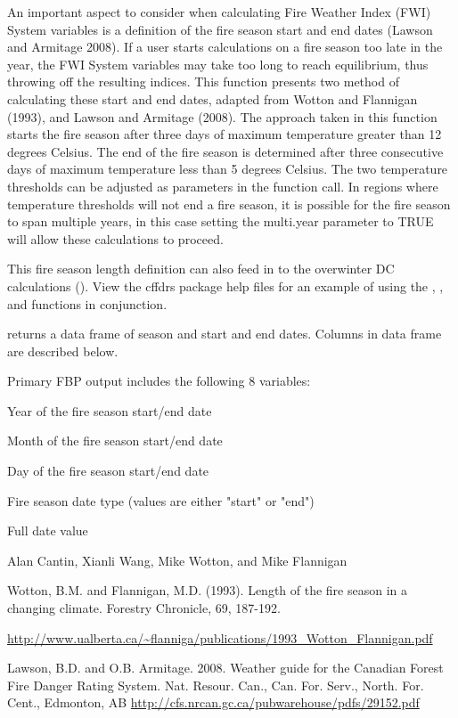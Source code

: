 \documentclass[a4paper]{book}
\begin{document}
\begin{Details}\relax
An important aspect to consider when calculating Fire Weather Index (FWI)
System variables is a definition of the fire season start and end dates
(Lawson and Armitage 2008). If a user starts calculations on a fire season
too late in the year, the FWI System variables may take too long to reach
equilibrium, thus throwing off the resulting indices. This function presents
two method of calculating these start and end dates, adapted from Wotton and
Flannigan (1993), and Lawson and Armitage (2008). The approach taken in this
function starts the fire season after three days of maximum temperature
greater than 12 degrees Celsius. The end of the fire season is determined
after three consecutive days of maximum temperature less than 5 degrees
Celsius.  The two temperature thresholds can be adjusted as parameters in
the function call. In regions where temperature thresholds will not end a
fire season, it is possible for the fire season to span multiple years, in
this case setting the multi.year parameter to TRUE will allow these
calculations to proceed.

This fire season length definition can also feed in to the overwinter DC
calculations (). View the cffdrs package help files for an example
of using the , , and  functions in
conjunction.
\end{Details}
%
\begin{Value}
 returns a data frame of season and start and end
dates. Columns in data frame are described below.

Primary FBP output includes the following 8 variables: 
\begin{ldescription}
\item[\code{yr }] Year of the fire season start/end date
\item[\code{mon }] Month of the fire season start/end date
\item[\code{day }] Day of the fire season start/end date
\item[\code{fsdatetype }] Fire season date type (values are either "start" or "end")
\item[\code{date}] Full date value
\end{ldescription}
\end{Value}
%
\begin{Author}\relax
Alan Cantin, Xianli Wang, Mike Wotton, and Mike Flannigan
\end{Author}
%
\begin{References}\relax
Wotton, B.M. and Flannigan, M.D. (1993). Length of the fire
season in a changing climate. Forestry Chronicle, 69, 187-192.

\url{http://www.ualberta.ca/~flanniga/publications/1993_Wotton_Flannigan.pdf}

Lawson, B.D. and O.B. Armitage. 2008. Weather guide for the Canadian Forest
Fire Danger Rating System. Nat. Resour. Can., Can. For. Serv., North. For.
Cent., Edmonton, AB \url{http://cfs.nrcan.gc.ca/pubwarehouse/pdfs/29152.pdf}
\end{References}
\end{document}
